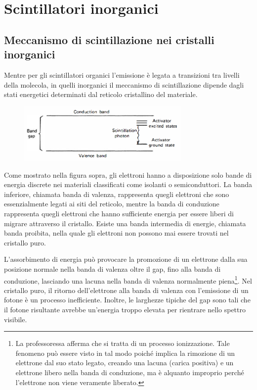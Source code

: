 \vfill

\section{Scintillatori inorganici}


\subsection{Meccanismo di scintillazione nei cristalli inorganici}
Mentre per gli scintillatori organici l'emissione è legata a transizioni tra livelli della molecola, in quelli inorganici il meccanismo di scintillazione dipende dagli stati energetici determinati dal reticolo cristallino del materiale.
\begin{figure}[H]
   \centering
   \includegraphics[width=0.75\textwidth]{immagini/Livelli_energetici_scintillatori_inorganici.png}
\end{figure}
Come mostrato nella figura sopra, gli elettroni hanno a disposizione solo bande di energia discrete nei materiali classificati come isolanti o semiconduttori. La banda inferiore, chiamata banda di valenza, rappresenta quegli elettroni che sono essenzialmente legati ai siti del reticolo, mentre la banda di conduzione rappresenta quegli elettroni che hanno sufficiente energia per essere liberi di migrare attraverso il cristallo. Esiste una banda intermedia di energie, chiamata banda proibita, nella quale gli elettroni non possono mai essere trovati nel cristallo puro.

L'assorbimento di energia può provocare la promozione di un elettrone dalla sua posizione normale nella banda di valenza oltre il gap, fino alla banda di conduzione, lasciando una lacuna nella banda di valenza normalmente piena\footnote{La professoressa afferma che si tratta di un processo ionizzazione. Tale fenomeno può essere visto in tal modo poiché implica la rimozione di un elettrone dal suo stato legato, creando una lacuna (carica positiva) e un elettrone libero nella banda di conduzione, ma è alquanto improprio perché l'elettrone non viene veramente liberato.}. Nel cristallo puro, il ritorno dell'elettrone alla banda di valenza con l'emissione di un fotone è un processo inefficiente. Inoltre, le larghezze tipiche del gap sono tali che il fotone risultante avrebbe un'energia troppo elevata per rientrare nello spettro visibile.

